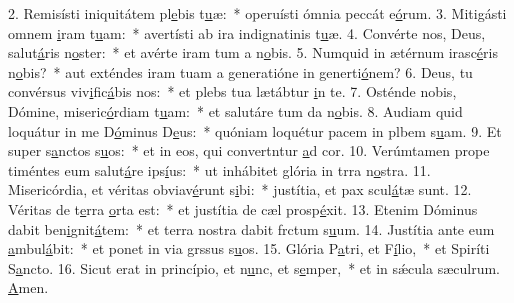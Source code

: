 2. Remisísti iniquitátem pl\uline{e}bis t\uline{u}æ:~* operuísti ómnia peccát e\uline{ó}rum.
3. Mitigásti omnem \uline{i}ram t\uline{u}am:~* avertísti ab ira indignatinis t\uline{u}æ.
4. Convérte nos, Deus, salut\uline{á}ris n\uline{o}ster:~* et avérte iram tum a n\uline{o}bis.
5. Numquid in ætérnum irasc\uline{é}ris n\uline{o}bis?~* aut exténdes iram tuam a generatióne in generti\uline{ó}nem?
6. Deus, tu convérsus viv\uline{i}fic\uline{á}bis nos:~* et plebs tua lætábtur \uline{i}n te.
7. Osténde nobis, Dómine, miseric\uline{ó}rdiam t\uline{u}am:~* et salutáre tum da n\uline{o}bis.
8. Audiam quid loquátur in me D\uline{ó}minus D\uline{e}us:~* quóniam loquétur pacem in plbem s\uline{u}am.
9. Et super s\uline{a}nctos s\uline{u}os:~* et in eos, qui convertntur \uline{a}d cor.
10. Verúmtamen prope timéntes eum salut\uline{á}re ips\uline{í}us:~* ut inhábitet glória in trra n\uline{o}stra.
11. Misericórdia, et véritas obviav\uline{é}runt s\uline{i}bi:~* justítia, et pax scul\uline{á}tæ sunt.
12. Véritas de t\uline{e}rra \uline{o}rta est:~* et justítia de cæl prosp\uline{é}xit.
13. Etenim Dóminus dabit ben\uline{i}gnit\uline{á}tem:~* et terra nostra dabit frctum s\uline{u}um.
14. Justítia ante eum \uline{a}mbul\uline{á}bit:~* et ponet in via grssus s\uline{u}os.
15. Glória P\uline{a}tri, et F\uline{í}lio,~* et Spiríti S\uline{a}ncto.
16. Sicut erat in princípio, et n\uline{u}nc, et s\uline{e}mper,~* et in sǽcula sæculrum. \uline{A}men.
